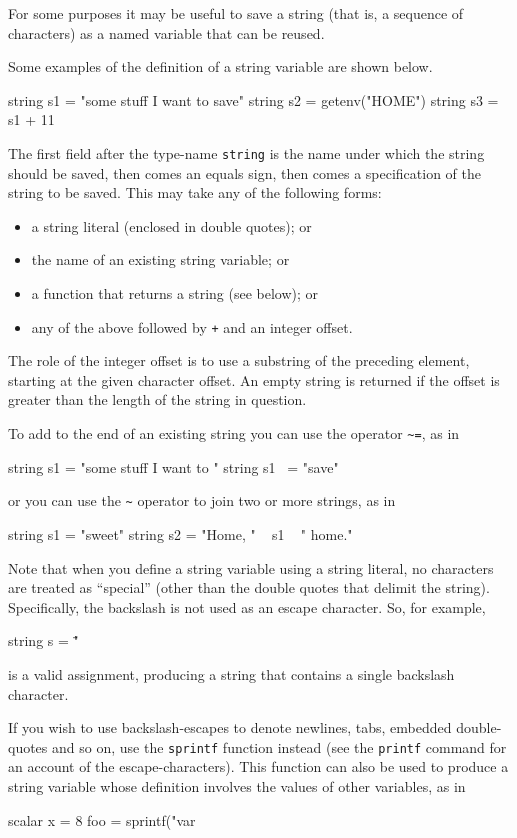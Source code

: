 For some purposes it may be useful to save a string (that is, a
sequence of characters) as a named variable that can be reused.

Some examples of the definition of a string variable are shown
below.
%
\begin{code}
string s1 = "some stuff I want to save"
string s2 = getenv("HOME")
string s3 = s1 + 11
\end{code}
%
The first field after the type-name \texttt{string} is the name under
which the string should be saved, then comes an equals sign, then
comes a specification of the string to be saved. This may take any of
the following forms:

\begin{itemize}
\item a string literal (enclosed in double quotes); or
\item the name of an existing string variable; or
\item a function that returns a string (see below); or
\item any of the above followed by \texttt{+} and an integer offset.
\end{itemize}

The role of the integer offset is to use a substring of the preceding
element, starting at the given character offset.  An empty string is
returned if the offset is greater than the length of the string in
question.

To add to the end of an existing string you can use the operator
\verb|~=|, as in
%
\begin{code}
string s1 = "some stuff I want to "
string s1 ~= "save"
\end{code}
or you can use the \verb|~| operator to join two or more strings, as
in
\begin{code}
string s1 = "sweet"
string s2 = "Home, " ~ s1 ~ " home."
\end{code}

Note that when you define a string variable using a string literal, no
characters are treated as ``special'' (other than the double quotes
that delimit the string).  Specifically, the backslash is not used as
an escape character.  So, for example,
%
\begin{code}
string s = "\"
\end{code}
%
is a valid assignment, producing a string that contains a single
backslash character.

If you wish to use backslash-escapes to denote newlines, tabs,
embedded double-quotes and so on, use the \texttt{sprintf} function
instead (see the \texttt{printf} command for an account of the
escape-characters). This function can also be used to produce
a string variable whose definition involves the values of other
variables, as in
%
\begin{code}
scalar x = 8
foo = sprintf("var%
\end{code}

